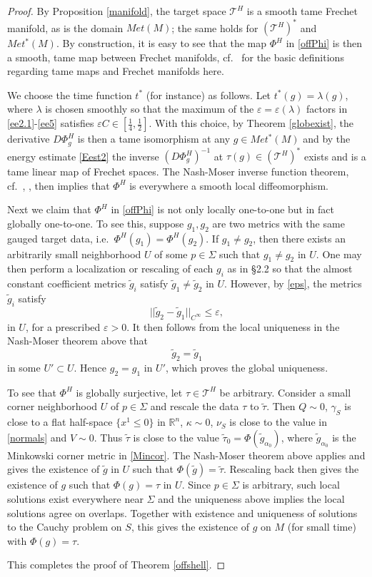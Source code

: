 \documentclass[10pt]{amsart}
\renewcommand{\a}{\alpha}
\newcommand{\g}{\gamma}
\newcommand{\e}{\varepsilon}
\newcommand{\Si}{\Sigma}
\renewcommand{\k}{\kappa}
\renewcommand{\l}{\lambda}
\newcommand{\cT}{{\mathcal T}}
\newcommand{\bR}{\mathbb R}
\newcommand{\<}{\langle}
\renewcommand{\>}{\rangle}
\newcommand{\w}{\widetilde}
\theoremstyle{plain}
\theoremstyle{remark}
\theoremstyle{definition}
\numberwithin{equation}{section}
\begin{document}
\begin{proof} 
By Proposition \ref{manifold}, the target space $\cT^H$ is a smooth tame Frechet manifold, as is the domain $Met(M)$; the same holds for $(\cT^H)^*$ and 
$Met^*(M)$. By construction, it is easy to see that the map $\Phi^H$ in \eqref{offPhi} is then a smooth, tame map between Frechet manifolds, cf.~\cite{Ham} 
for the basic definitions regarding tame maps and Frechet manifolds here. 

  We choose the time function $t^*$ (for instance) as follows. Let $t^*(g) = \l(g)$, where $\l$ is chosen smoothly so that the maximum of the $\e = \e(\l)$ factors in 
\eqref{ee2.1}-\eqref{ee5} satisfies $\e C \in [\frac{1}{4}, \frac{1}{2}]$. With this choice, by Theorem \ref{globexist}, the derivative $D\Phi_g^H$ is then a tame 
isomorphism at any $g \in Met^*(M)$ and by the energy estimate \eqref{Eest2} the inverse $(D\Phi_g^H)^{-1}$ at $\tau(g) \in (\cT^H)^*$ exists and is a tame 
linear map of Frechet spaces. The Nash-Moser inverse function theorem, cf.~\cite{Ham}, \cite{Z2}, then implies that $\Phi^H$ is everywhere a smooth 
local diffeomorphism. 

  Next we claim that $\Phi^H$ in \eqref{offPhi} is not only locally one-to-one but in fact globally one-to-one. To see this, suppose $g_1, g_2$ are two metrics 
with the same gauged target data, i.e.~$\Phi^H(g_1) = \Phi^H(g_2)$. If $g_1 \neq g_2$, then there exists an arbitrarily small neighborhood 
$U$ of some $p \in \Si$ such that $g_1 \neq g_2$ in $U$. One may then perform a localization or rescaling of each $g_i$ as in \S 2.2 so that the almost 
constant coefficient metrics $\w g_i$ satisfy $\w g_1 \neq \w g_2$ in $U$. However, by \eqref{eps}, the metrics $\w g_i$ satisfy 
$$|| \w g_2 - \w g_1||_{C^{\infty}} \leq \e,$$
in $U$, for a prescribed $\e > 0$. It then follows from the local uniqueness in the Nash-Moser theorem above that 
$$\w g_2 = \w g_1$$
in some $U' \subset U$. Hence $g_2 = g_1$ in $U'$, which proves the global uniqueness. 

  To see that $\Phi^H$ is globally surjective, let $\tau \in \cT^H$ be arbitrary. Consider a small corner neighborhood $U$ of $p \in \Si$ and rescale the data 
$\tau$ to $\w \tau$. Then $Q \sim 0$, $\g_S$ is close to a flat half-space $\{x^1 \leq 0\}$ in $\bR^n$, $\k \sim 0$, $\nu_S$ is close to the value in \eqref{normals} 
and $V \sim 0$. Thus $\w \tau$ is close to the value $\w \tau_0 =  \Phi(\w g_{\a_0})$, where $\w g_{\a_0}$ is the Minkowski corner metric in \eqref{Mincor}. 
The Nash-Moser theorem above applies and gives the existence of $\w g$ in $U$ such that $\Phi(\w g) = \w \tau$. Rescaling back then gives the existence 
of $g$ such that $\Phi(g) = \tau$ in $U$. Since $p \in \Si$ is arbitrary, such local solutions exist everywhere near $\Si$ and the uniqueness above implies 
the local solutions agree on overlaps. Together with existence and uniqueness of solutions to the Cauchy problem on $S$, this gives the existence of $g$ 
on $M$ (for small time) with $\Phi(g) = \tau$. 
  
This completes the proof of Theorem \ref{offshell}. 

\end{proof}
\end{document}
